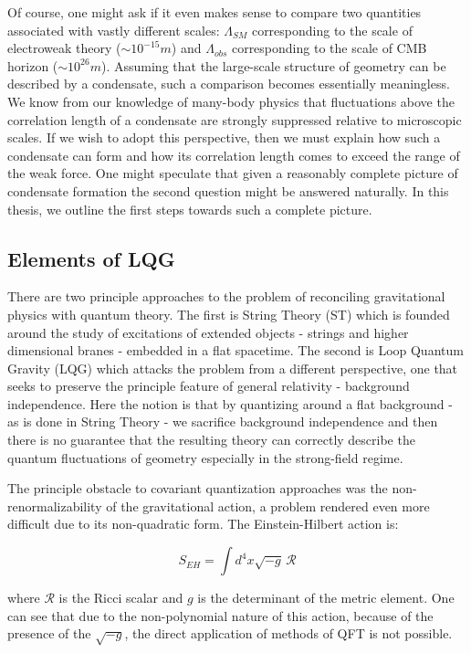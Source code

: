 \begin{doublespace}
Of course, one might ask if it even makes sense to compare two quantities associated with vastly different scales: $\Lambda_{SM}$ corresponding to the scale of electroweak theory ($\sim 10^{-15} m$) and $\Lambda_{obs}$ corresponding to the scale of CMB horizon ($\sim 10^{26} m$). Assuming that the large-scale structure of geometry can be described by a condensate, such a comparison becomes essentially meaningless. We know from our knowledge of many-body physics that fluctuations above the correlation length of a condensate are strongly suppressed relative to microscopic scales. If we wish to adopt this perspective, then we must explain how such a condensate can form and how its correlation length comes to exceed the range of the weak force. One might speculate that given a reasonably complete picture of condensate formation the second question might be answered naturally. In this thesis, we outline the first steps towards such a complete picture.

\subsection{Elements of LQG}

There are two principle approaches to the problem of reconciling gravitational physics with quantum theory. The first is String Theory (ST) which is founded around the study of excitations of extended objects - strings and higher dimensional branes - embedded in a flat spacetime. The second is Loop Quantum Gravity (LQG) which attacks the problem from a different perspective, one that seeks to preserve the principle feature of general relativity - background independence. Here the notion is that by quantizing around a flat background - as is done in String Theory - we sacrifice background independence and then there is no guarantee that the resulting theory can correctly describe the quantum fluctuations of geometry especially in the strong-field regime.

The principle obstacle to covariant quantization approaches was the non-renormalizability of the gravitational action, a problem rendered even more difficult due to its non-quadratic form. The Einstein-Hilbert action is:

\begin{equation}\label{eqn:EinsteinHilbert}
	S_{EH} = \int d^{4}x \sqrt{-g} \, \mathcal{R}
\end{equation}

where $\mathcal{R}$ is the Ricci scalar and $g$ is the determinant of the metric element. One can see that due to the non-polynomial nature of this action, because of the presence of the $ \sqrt{-g} $, the direct application of methods of QFT is not possible.


\end{doublespace}
